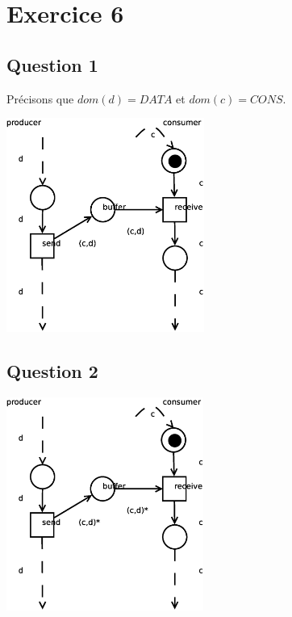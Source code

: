 \section*{Exercice 6}

\subsection*{Question 1}

Précisons que $dom(d)=DATA$ et $dom(c)=CONS$.

\begin{center}
\includegraphics[height=7cm]{exo6_1.eps}
\end{center}

\subsection*{Question 2}

\begin{center}
\includegraphics[height=7cm]{exo6_2.eps}
\end{center}
